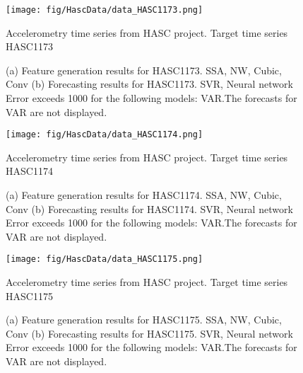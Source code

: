 \documentclass[12pt]{article}
\begin{document}
\begin{figure}
\centering
\texttt{[image: fig/HascData/data\_HASC1173.png]}
\caption{Accelerometry time series from HASC project. Target time series	HASC1173	}
\end{figure}


\begin{figure}
\centering
{}
\caption{(a)	Feature generation results for	HASC1173.	SSA, NW, Cubic, Conv	(b)	Forecasting results for	HASC1173.	SVR, Neural network	Error exceeds 1000 for the following models: VAR.The forecasts for VAR are not displayed.	}
\end{figure}


\begin{figure}
\centering
\texttt{[image: fig/HascData/data\_HASC1174.png]}
\caption{Accelerometry time series from HASC project. Target time series	HASC1174	}
\end{figure}


\begin{figure}
\centering
{}
\caption{(a)	Feature generation results for	HASC1174.	SSA, NW, Cubic, Conv	(b)	Forecasting results for	HASC1174.	SVR, Neural network	Error exceeds 1000 for the following models: VAR.The forecasts for VAR are not displayed.	}
\end{figure}


\begin{figure}
\centering
\texttt{[image: fig/HascData/data\_HASC1175.png]}
\caption{Accelerometry time series from HASC project. Target time series	HASC1175	}
\end{figure}


\begin{figure}
\centering
{}
\caption{(a)	Feature generation results for	HASC1175.	SSA, NW, Cubic, Conv	(b)	Forecasting results for	HASC1175.	SVR, Neural network	Error exceeds 1000 for the following models: VAR.The forecasts for VAR are not displayed.	}
\end{figure}
\end{document}

